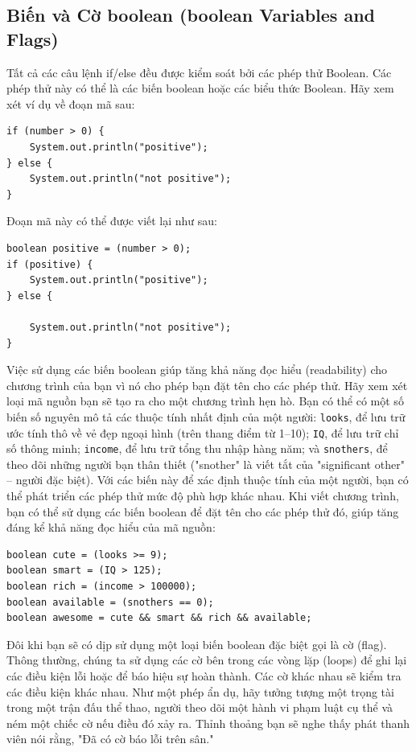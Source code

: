 \subsection*{Biến và Cờ boolean (boolean Variables and Flags)}

Tất cả các câu lệnh if/else đều được kiểm soát bởi các phép thử Boolean. Các phép thử này có thể là các biến boolean hoặc các biểu thức Boolean. Hãy xem xét ví dụ về đoạn mã sau:

\begin{verbatim}
if (number > 0) {
    System.out.println("positive");
} else {
    System.out.println("not positive");
}
\end{verbatim}

Đoạn mã này có thể được viết lại như sau:

\begin{verbatim}
boolean positive = (number > 0);
if (positive) {
    System.out.println("positive");
} else {

    System.out.println("not positive");
}
\end{verbatim}

Việc sử dụng các biến boolean giúp tăng khả năng đọc hiểu (readability) cho chương trình của bạn vì nó cho phép bạn đặt tên cho các phép thử. Hãy xem xét loại mã nguồn bạn sẽ tạo ra cho một chương trình hẹn hò. Bạn có thể có một số biến số nguyên mô tả các thuộc tính nhất định của một người: \texttt{looks}, để lưu trữ ước tính thô về vẻ đẹp ngoại hình (trên thang điểm từ 1--10); \texttt{IQ}, để lưu trữ chỉ số thông minh; \texttt{income}, để lưu trữ tổng thu nhập hàng năm; và \texttt{snothers}, để theo dõi những người bạn thân thiết ("snother" là viết tắt của "significant other" -- người đặc biệt). Với các biến này để xác định thuộc tính của một người, bạn có thể phát triển các phép thử mức độ phù hợp khác nhau. Khi viết chương trình, bạn có thể sử dụng các biến boolean để đặt tên cho các phép thử đó, giúp tăng đáng kể khả năng đọc hiểu của mã nguồn:

\begin{verbatim}
boolean cute = (looks >= 9);
boolean smart = (IQ > 125);
boolean rich = (income > 100000);
boolean available = (snothers == 0);
boolean awesome = cute && smart && rich && available;
\end{verbatim}

Đôi khi bạn sẽ có dịp sử dụng một loại biến boolean đặc biệt gọi là cờ (flag). Thông thường, chúng ta sử dụng các cờ bên trong các vòng lặp (loops) để ghi lại các điều kiện lỗi hoặc để báo hiệu sự hoàn thành. Các cờ khác nhau sẽ kiểm tra các điều kiện khác nhau. Như một phép ẩn dụ, hãy tưởng tượng một trọng tài trong một trận đấu thể thao, người theo dõi một hành vi phạm luật cụ thể và ném một chiếc cờ nếu điều đó xảy ra. Thỉnh thoảng bạn sẽ nghe thấy phát thanh viên nói rằng, "Đã có cờ báo lỗi trên sân."

